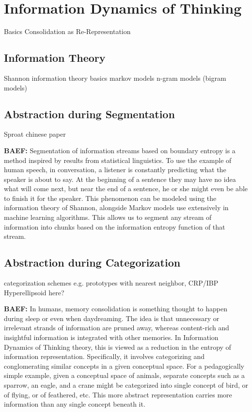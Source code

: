 \documentclass{article}
\begin{document}

\section{Information Dynamics of Thinking}
Basics
Consolidation as Re-Representation

\subsection{Information Theory}
Shannon information theory basics
markov models
n-gram models (bigram models)

\subsection{Abstraction during Segmentation}
Sproat chinese paper

\textbf{BAEF:} Segmentation of information streams based on boundary entropy is a method inspired by results from statistical linguistics.  To use the example of human speech, in conversation, a listener is constantly predicting what the speaker is about to say.  At the beginning of a sentence they may have no idea what will come next, but near the end of a sentence, he or she might even be able to finish it for the speaker.  This phenomenon can be modeled using the information theory of Shannon, alongside Markov models use extensively in machine learning algorithms.  This allows us to segment any stream of information into chunks based on the information entropy function of that stream.

\subsection{Abstraction during Categorization}
categorization schemes e.g. prototypes with nearest neighbor, CRP/IBP
Hyperellipsoid here?

\textbf{BAEF:} In humans, memory consolidation is something thought to happen during sleep or even when daydreaming. The idea is that unnecessary or irrelevant strands of information are pruned away, whereas content-rich and insightful information is integrated with other memories. In Information Dynamics of Thinking theory, this is viewed as a reduction in the entropy of information representation. Specifically, it involves categorizing and conglomerating similar concepts in a given conceptual space. For a pedagogically simple example, given a conceptual space of animals, separate concepts such as a sparrow, an eagle, and a crane might be categorized into single concept of bird, or of flying, or of feathered, etc. This more abstract representation carries more information than any single concept beneath it. 
\end{document}
